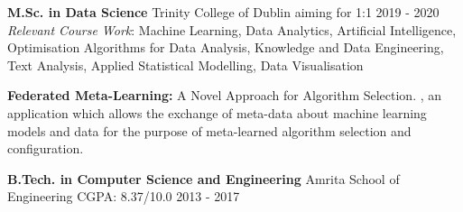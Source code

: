 \vspace{0.5ex}
\begin{cventries}
  \cventry
    {\textbf{M.Sc. in Data Science}}
    {Trinity College of Dublin}
    {aiming for 1:1}
    {2019 - 2020}
    {\textit{Relevant Course Work}: Machine Learning, Data Analytics, Artificial Intelligence, Optimisation Algorithms for Data Analysis, Knowledge and Data Engineering, Text Analysis, Applied Statistical Modelling, Data Visualisation}
    
    \begin{cvskills}
        {\textbf{Federated Meta-Learning:} A Novel Approach for Algorithm Selection.}
        \cvskill{}
        {, an application which allows the exchange of meta-data about machine learning models and data for the purpose of meta-learned algorithm selection and configuration.}
    \end{cvskills}
  
  \cventry
    {\textbf{B.Tech. in Computer Science and Engineering}}
    {Amrita School of Engineering}
    {CGPA: 8.37/10.0}
    {2013 - 2017}
    {}%
    \vspace{-2.5ex}
\end{cventries}
